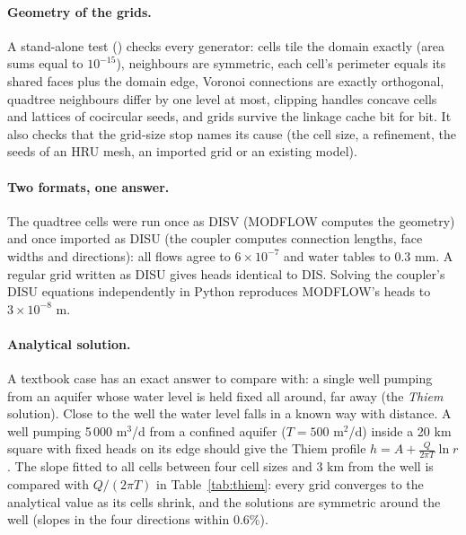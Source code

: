 \paragraph{Geometry of the grids.} A stand-alone test () checks every generator: cells tile the
domain exactly (area sums equal to $10^{-15}$), neighbours are symmetric, each cell's perimeter equals its shared faces plus
the domain edge, Voronoi connections are exactly orthogonal, quadtree neighbours differ by one level at most, clipping
handles concave cells and lattices of cocircular seeds, and grids survive the linkage cache bit for bit. It also checks
that the grid-size stop names its cause (the cell size, a refinement, the seeds of an HRU mesh, an imported grid or an
existing model).

\paragraph{Two formats, one answer.} The quadtree cells were run once as DISV (MODFLOW computes the geometry) and once
imported as DISU (the coupler computes connection lengths, face widths and directions): all flows agree to $6\times10^{-7}$ and
water tables to 0.3 mm. A regular grid written as DISU gives heads identical to DIS. Solving the coupler's DISU equations
independently in Python reproduces MODFLOW's heads to $3\times10^{-8}$ m.

\paragraph{Analytical solution.} A textbook case has an exact answer to compare with: a single well pumping from an aquifer
whose water level is held fixed all around, far away (the \emph{Thiem} solution). Close to the well the water level falls in
a known way with distance. A well pumping 5\,000 m$^3$/d from a confined aquifer ($T=500$ m$^2$/d) inside a
20 km square with fixed heads on its edge should give the Thiem profile $h=A+\frac{Q}{2\pi T}\ln r$. The slope fitted to
all cells between four cell sizes and 3 km from the well is compared with $Q/(2\pi T)$ in Table~\ref{tab:thiem}: every grid
converges to the analytical value as its cells shrink, and the solutions are symmetric around the well (slopes in the four
directions within 0.6\%).

